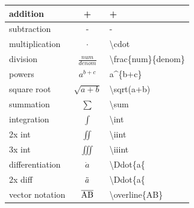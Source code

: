 \begin{table}[H]
\centering
\renewcommand{\arraystretch}{1.5}
\begin{tabular}{|l |c|l|} \hline   
addition & + & + \\ \hline 
subtraction & - & - \\ \hline 
multiplication & $\cdot$ & \textbackslash{cdot} \\ \hline 
division & $\frac{num}{denom}$ & \textbackslash{frac\{num\}\{denom\}} \\ \hline 
powers & $a^{b+c}$ & a\^ \space\{b+c\}\\ \hline 
square root & $\sqrt{a+b} $ & \textbackslash{sqrt(a+b)} \\ \hline 
summation & $\sum $ & \textbackslash{sum} \\ \hline 
integration & $\int$ & \textbackslash{}int \\ \hline 
2x int & $\iint$ & \textbackslash{}iint \\ \hline 
3x int & $\iiint$ & \textbackslash{}iiint \\ \hline 
differentiation & $\dot{a}$ & \textbackslash{Ddot\{a\{}\\ \hline 
2x diff & $\Ddot{a}$ & \textbackslash{Ddot\{a\{}\\ \hline 
vector notation & $\overline{\rm AB}$  & \textbackslash{}overline\{\rm AB\}  \\ \hline

\end{tabular}

\end{table}

